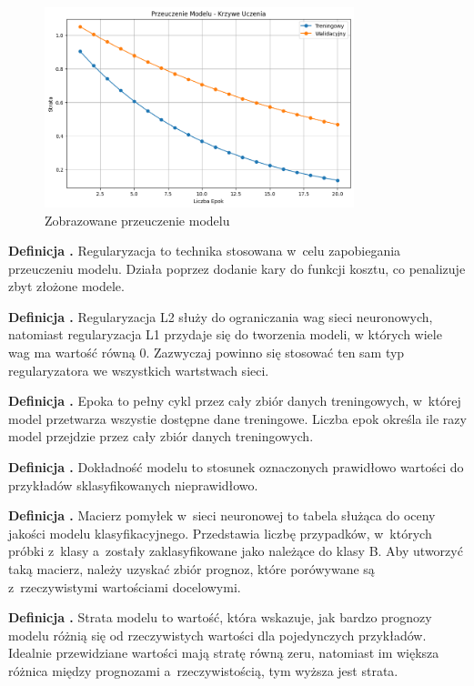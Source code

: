 \begin{figure}[ht]
	\centering
	\includegraphics[width=9cm]{resources/machine-learning/images/def_overfit.png}
	\caption{Zobrazowane przeuczenie modelu}
    \label{Fig:def-2}
\end{figure}
\FloatBarrier

\noindent
\textbf{Definicja .}
\incrementdefinitionIndex
Regularyzacja to technika stosowana w~celu zapobiegania przeuczeniu modelu.
Działa poprzez dodanie kary do funkcji kosztu, co penalizuje zbyt złożone modele.

\noindent
\textbf{Definicja .}
\incrementdefinitionIndex
Regularyzacja L2 służy do ograniczania wag sieci neuronowych,
natomiast regularyzacja L1 przydaje się do tworzenia modeli, w których wiele wag ma wartość równą 0. 
Zazwyczaj powinno się stosować ten sam typ regularyzatora we wszystkich wartstwach sieci.

\noindent
\textbf{Definicja .}
\incrementdefinitionIndex
Epoka to pełny cykl przez cały zbiór danych treningowych, w~której model przetwarza wszystie dostępne dane treningowe.
Liczba epok określa ile razy model przejdzie przez cały zbiór danych treningowych.

\noindent
\textbf{Definicja .}
\incrementdefinitionIndex
Dokładność modelu to stosunek oznaczonych prawidłowo wartości do przykładów sklasyfikowanych nieprawidłowo.

\noindent
\textbf{Definicja .}
\incrementdefinitionIndex
Macierz pomyłek w~sieci neuronowej to tabela służąca do oceny jakości modelu klasyfikacyjnego.
Przedstawia liczbę przypadków, w~których próbki z~klasy a~zostały zaklasyfikowane jako należące do klasy B.
Aby utworzyć taką macierz, należy uzyskać zbiór prognoz, które porówywane są z~rzeczywistymi wartościami docelowymi.

\noindent
\textbf{Definicja .}
\incrementdefinitionIndex
Strata modelu to wartość, która wskazuje,
jak bardzo prognozy modelu różnią się od rzeczywistych wartości dla pojedynczych przykładów.
Idealnie przewidziane wartości mają stratę równą zeru,
natomiast im większa różnica między prognozami a~rzeczywistością, tym wyższa jest strata.

